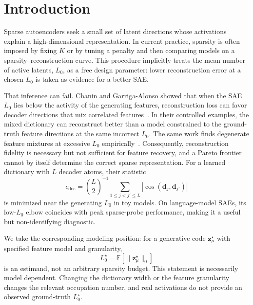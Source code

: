 \documentclass[aps,pre,reprint,superscriptaddress,amsmath,amssymb,nofootinbib]{revtex4-2}
\newcommand{\E}{\mathbb{E}}
\begin{document}
\maketitle

\section{Introduction}
\label{sec:introduction}

Sparse autoencoders seek a small set of latent directions whose activations
explain a high-dimensional representation.  In current practice, sparsity is
often imposed by fixing $K$ or by tuning a penalty and then comparing models
on a sparsity--reconstruction curve.  This procedure implicitly treats the
mean number of active latents, $L_0$, as a free design parameter: lower
reconstruction error at a chosen $L_0$ is taken as evidence for a better SAE\@.

That inference can fail.  Chanin and Garriga-Alonso showed that when the SAE
$L_0$ lies below the activity of the generating features, reconstruction loss
can favor decoder directions that mix correlated
features~\cite{chanin2026sparse}.  In their controlled examples, the mixed
dictionary can reconstruct better than a model constrained to the ground-truth
feature directions at the same incorrect $L_0$.  The same work finds
degenerate feature mixtures at excessive $L_0$
empirically~\cite{chanin2026sparse}.  Consequently,
reconstruction fidelity is necessary but not sufficient for feature recovery,
and a Pareto frontier cannot by itself determine the correct sparse
representation.  For a learned dictionary with $L$ decoder atoms, their
statistic
\begin{equation}
 c_{\mathrm{dec}}
 = \binom{L}{2}^{-1}\sum_{1\leq j<j'\leq L}
   \left|\cos(\bm d_j,\bm d_{j'})\right|
 \label{eq:cdec}
\end{equation}
is minimized near the generating $L_0$ in toy models.  On language-model SAEs,
its low-$L_0$ elbow coincides with peak sparse-probe performance, making it a
useful but non-identifying diagnostic.

We take the corresponding modeling position: for a generative code
$\bm z^\star_\mu$ with specified feature model and granularity,
\begin{equation}
 L_0^\star = \E\!\left[\lVert \bm z^\star_\mu\rVert_0\right]
\end{equation}
is an estimand, not an arbitrary sparsity budget.  This statement is
necessarily model dependent.  Changing the dictionary width or the feature
granularity changes the relevant occupation number, and real activations do
not provide an observed ground-truth $L_0^\star$.
\end{document}
